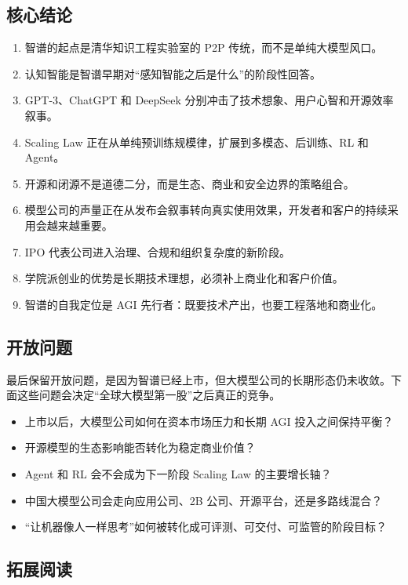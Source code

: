 \documentclass[a4paper]{article}
\begin{document}
\subsection{核心结论}

\begin{enumerate}
\item 智谱的起点是清华知识工程实验室的 P2P 传统，而不是单纯大模型风口。
\item 认知智能是智谱早期对“感知智能之后是什么”的阶段性回答。
\item GPT-3、ChatGPT 和 DeepSeek 分别冲击了技术想象、用户心智和开源效率叙事。
\item Scaling Law 正在从单纯预训练规模律，扩展到多模态、后训练、RL 和 Agent。
\item 开源和闭源不是道德二分，而是生态、商业和安全边界的策略组合。
\item 模型公司的声量正在从发布会叙事转向真实使用效果，开发者和客户的持续采用会越来越重要。
\item IPO 代表公司进入治理、合规和组织复杂度的新阶段。
\item 学院派创业的优势是长期技术理想，必须补上商业化和客户价值。
\item 智谱的自我定位是 AGI 先行者：既要技术产出，也要工程落地和商业化。
\end{enumerate}

\subsection{开放问题}

最后保留开放问题，是因为智谱已经上市，但大模型公司的长期形态仍未收敛。下面这些问题会决定“全球大模型第一股”之后真正的竞争。

\begin{itemize}
\item 上市以后，大模型公司如何在资本市场压力和长期 AGI 投入之间保持平衡？
\item 开源模型的生态影响能否转化为稳定商业价值？
\item Agent 和 RL 会不会成为下一阶段 Scaling Law 的主要增长轴？
\item 中国大模型公司会走向应用公司、2B 公司、开源平台，还是多路线混合？
\item “让机器像人一样思考”如何被转化成可评测、可交付、可监管的阶段目标？
\end{itemize}

\subsection{拓展阅读}
\end{document}
